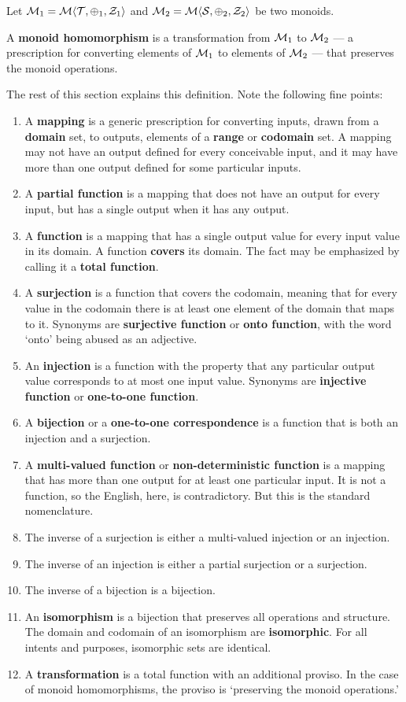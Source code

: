 Let $\mathcal{M}_{1}=\mathcal{M}\langle{\mathcal{T}},{\oplus_{1}},{\mathcal{Z}_{1}}\rangle$ and $\mathcal{M}_{2}=\mathcal{M}\langle{\mathcal{S}},{\oplus_{2}},{\mathcal{Z}_{2}}\rangle$ be two monoids.
\begin{definition}
A \textbf{monoid homomorphism} is a transformation from $\mathcal{M}_{1}$ to $\mathcal{M}_{2}$ --- a prescription for converting elements of $\mathcal{M}_{1}$ to elements of $\mathcal{M}_{2}$ --- that preserves the monoid operations.
\label{def:monoidhomomorphism}
\end{definition}
The rest of this section explains this definition. Note the following fine points:
\begin{enumerate}
  \item A \textbf{mapping} is a generic prescription for converting inputs, drawn from a \textbf{domain} set, to outputs, elements of a \textbf{range} or \textbf{codomain} set. A mapping may not have an output defined for every conceivable input, and it may have more than one output defined for some particular inputs.
	\item A \textbf{partial function} is a mapping that does not have an output for every input, but has a single output when it has any output.
	\item A \textbf{function} is a mapping that has a single output value for every input value in its domain. A function \textbf{covers} its domain. The fact may be emphasized by calling it a \textbf{total function}.
	\item A \textbf{surjection} is a function that covers the codomain, meaning that for every value in the codomain there is at least one element of the domain that maps to it. Synonyms are \textbf{surjective function} or \textbf{onto function}, with the word `onto' being abused as an adjective.
	\item An \textbf{injection} is a function with the property that any particular output value corresponds to at most one input value. Synonyms are \textbf{injective function} or \textbf{one-to-one function}.
  \item A \textbf{bijection} or a \textbf{one-to-one correspondence} is a function that is both an injection and a surjection.
	\item A \textbf{multi-valued function} or \textbf{non-deterministic function} is a mapping that has more than one output for at least one particular input. It is not a function, so the English, here, is contradictory. But this is the standard nomenclature.
	\item The inverse of a surjection is either a multi-valued injection or an injection.
	\item The inverse of an injection is either a partial surjection or a surjection.
	\item The inverse of a bijection is a bijection.
	\item An \textbf{isomorphism} is a bijection that preserves all operations and structure. The domain and codomain of an isomorphism are \textbf{isomorphic}. For all intents and purposes, isomorphic sets are identical.
	\item A \textbf{transformation} is a total function with an additional proviso. In the case of monoid homomorphisms, the proviso is `preserving the monoid operations.'
\end{enumerate}


